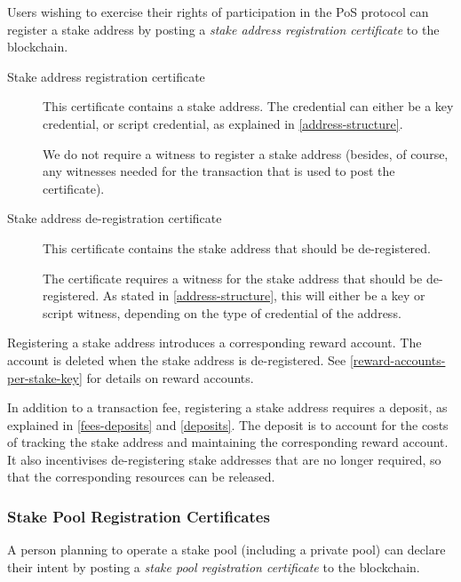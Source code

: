 \documentclass[11pt,a4paper,dvipsnames,twosided]{article}
\begin{document}
Users wishing to exercise their rights of participation in the PoS protocol can
register a stake address by posting a \emph{stake address registration
  certificate} to the blockchain.

\begin{description}
\item[Stake address registration certificate] This certificate contains a stake
  address. The credential can either be a key credential, or script credential,
  as explained in \cref{address-structure}.

  We do not require a witness to register a stake address (besides, of course,
  any witnesses needed for the transaction that is used to post the
  certificate).

\item[Stake address de-registration certificate]
This certificate contains the stake address that should be de-registered.

The certificate requires a witness for the stake address that should be
de-registered. As stated in \cref{address-structure}, this will either be a key
or script witness, depending on the type of credential of the address.

\end{description}

Registering a stake address introduces a corresponding reward account.
The account is deleted when the stake address is de-registered. See
\cref{reward-accounts-per-stake-key} for details on reward accounts.

In addition to a transaction fee, registering a stake address requires a
deposit, as explained in \cref{fees-deposits} and \cref{deposits}. The deposit
is to account for the costs of tracking the stake address and maintaining the
corresponding reward account. It also incentivises de-registering stake
addresses that are no longer required, so that the corresponding resources can
be released.

\subsubsection{Stake Pool Registration Certificates}
\label{stake-pool-registration-certificates}

A person planning to operate a stake pool (including a private pool) can
declare their intent by posting a \emph{stake pool registration certificate} to
the blockchain.
\end{document}

